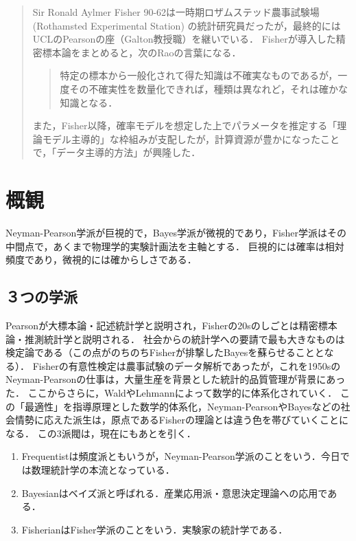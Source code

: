 \documentclass[uplatex,dvipdfmx]{jsreport}
\begin{document}
\begin{quotation}
    Sir Ronald Aylmer Fisher 90-62は一時期ロザムステッド農事試験場 (Rothamsted Experimental Station) の統計研究員だったが，最終的にはUCLのPearsonの座（Galton教授職）を継いでいる．
    Fisherが導入した精密標本論をまとめると，次のRaoの言葉になる．
    \begin{quote}
        特定の標本から一般化されて得た知識は不確実なものであるが，一度その不確実性を数量化できれば，種類は異なれど，それは確かな知識となる．
    \end{quote}

    また，Fisher以降，確率モデルを想定した上でパラメータを推定する「理論モデル主導的」な枠組みが支配したが，計算資源が豊かになったことで，「データ主導的方法」が興隆した．
\end{quotation}

\section{概観}

\begin{tcolorbox}[colframe=ForestGreen, colback=ForestGreen!10!white,breakable,colbacktitle=ForestGreen!40!white,coltitle=black,fonttitle=\bfseries\sffamily,
title=]
    Neyman-Pearson学派が巨視的で，Bayes学派が微視的であり，Fisher学派はその中間点で，あくまで物理学的実験計画法を主軸とする．
    巨視的には確率は相対頻度であり，微視的には確からしさである．
\end{tcolorbox}

\subsection{３つの学派}

\begin{history}
    Pearsonが大標本論・記述統計学と説明され，Fisherの20sのしごとは精密標本論・推測統計学と説明される．
    社会からの統計学への要請で最も大きなものは検定論である（この点がのちのちFisherが排撃したBayesを蘇らせることとなる）．
    Fisherの有意性検定は農事試験のデータ解析であったが，これを1950sのNeyman-Pearsonの仕事は，大量生産を背景とした統計的品質管理が背景にあった．
    ここからさらに，WaldやLehmannによって数学的に体系化されていく．
    この「最適性」を指導原理とした数学的体系化，Neyman-PearsonやBayesなどの社会情勢に応えた派生は，原点であるFisherの理論とは違う色を帯びていくことになる．
    この3派閥は，現在にもあとを引く．
    \begin{enumerate}
        \item Frequentistは頻度派ともいうが，Neyman-Pearson学派のことをいう．今日では数理統計学の本流となっている．
        \item Bayesianはベイズ派と呼ばれる．産業応用派・意思決定理論への応用である．
        \item FisherianはFisher学派のことをいう．実験家の統計学である．
    \end{enumerate}
\end{history}
\end{document}
